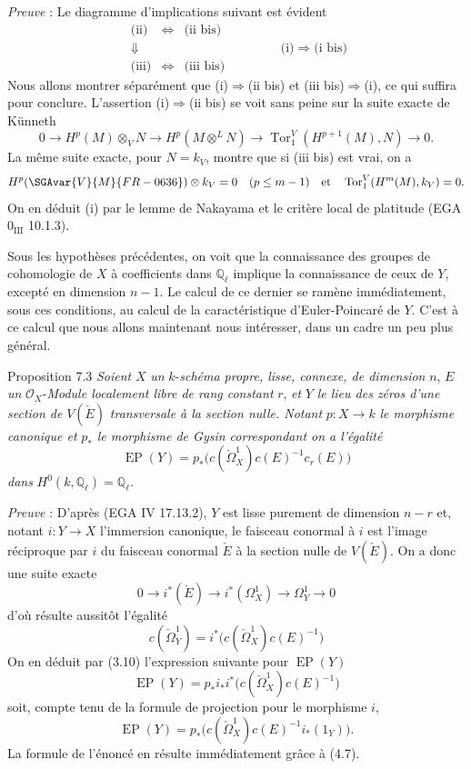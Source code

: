 \emph{Preuve} : Le diagramme d'implications suivant est évident
\[
\begin{array}{ccc}
\text{(ii)}&\Leftrightarrow&\text{(ii bis)}\\
\Downarrow&&\\
\text{(iii)}&\Leftrightarrow&\text{(iii bis)}
\end{array}
\qquad\qquad
\text{(i)}\Rightarrow\text{(i bis)}
\]
Nous allons montrer séparément que (i)$\Rightarrow$(ii bis) et (iii bis)$\Rightarrow$(i), ce qui suffira pour conclure. L'assertion (i)$\Rightarrow$(ii bis) se voit sans peine sur la suite exacte de Künneth
\[
0\to H^p(M)\otimes_V N\to H^p(M\otimes^L N)\to \operatorname{Tor}_1^V(H^{p+1}(M),N)\to0.
\]
La même suite exacte, pour $N=k_V$, montre que si (iii bis) est vrai, on a
\[
H^p(\SGAvar{V}{M}{FR-0636})\otimes k_V=0\quad(p\le m-1)\quad\text{et}\quad
\operatorname{Tor}_1^V(H^m(M),k_V)=0.
\]
On en
déduit (i) par le lemme de Nakayama et le critère local de platitude (EGA $0_{\mathrm{III}}$ 10.1.3).

Sous les hypothèses précédentes, on voit que la connaissance des groupes de cohomologie de $X$ à coefficients dans $\mathbb{Q}_\ell$ implique la connaissance de ceux de $Y$, excepté en dimension $n-1$. Le calcul de ce dernier se ramène immédiatement, sous ces conditions, au calcul de la caractéristique d'Euler-Poincaré de $Y$. C'est à ce calcul que nous allons maintenant nous intéresser, dans un cadre un peu plus général.

\begin{statement}{Proposition 7.3}
\emph{Soient} $X$ \emph{un} $k$-\emph{schéma propre, lisse, connexe, de dimension} $n$, $E$ \emph{un} $\mathcal{O}_X$-\emph{Module localement libre de rang constant} $r$, \emph{et} $Y$ \emph{le lieu des zéros d'une section de} $V(\check E)$ \emph{transversale à la section nulle. Notant} $p:X\to k$ \emph{le morphisme canonique et} $p_*$ \emph{le morphisme de Gysin correspondant on a l'égalité}
\[
\operatorname{EP}(Y)=p_*\bigl(c(\check\Omega_X^1)c(E)^{-1}c_r(E)\bigr)
\]
\emph{dans} $H^0(k,\mathbb{Q}_\ell)=\mathbb{Q}_\ell$.
\end{statement}

\emph{Preuve} : D'après (EGA IV 17.13.2), $Y$ est lisse purement de dimension $n-r$ et, notant $i:Y\to X$ l'immersion canonique, le faisceau conormal à $i$ est l'image réciproque par $i$ du faisceau conormal $\check E$ à la section nulle de $V(\check E)$. On a donc une suite exacte
\[
0\to i^*(\check E)\to i^*(\Omega_X^1)\to\Omega_Y^1\to0
\tag{7.3.1}
\]
d'où résulte aussitôt l'égalité
\[
c(\check\Omega_Y^1)=i^*\bigl(c(\check\Omega_X^1)c(E)^{-1}\bigr)
\tag{7.3.2}
\]
On en déduit par (3.10) l'expression suivante pour $\operatorname{EP}(Y)$
\[
\operatorname{EP}(Y)=p_*i_*i^*\bigl(c(\check\Omega_X^1)c(E)^{-1}\bigr)
\]
soit, compte tenu de la formule de projection pour le morphisme $i$,
\[
\operatorname{EP}(Y)=p_*\bigl(c(\check\Omega_X^1)c(E)^{-1}i_*(1_Y)\bigr).
\]
La formule de l'énoncé en résulte immédiatement grâce à (4.7).

